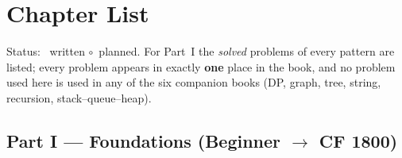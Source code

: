 \section*{Chapter List}

Status: \yes~written \quad $\circ$~planned. For Part~I the \emph{solved} problems of every pattern are listed; every problem appears in exactly \textbf{one} place in the book, and no problem used here is used in any of the six companion books (DP, graph, tree, string, recursion, stack--queue--heap).

\begingroup
\small
\renewcommand{\arraystretch}{1.25}

\subsection*{Part I --- Foundations (Beginner $\to$ CF 1800)}
